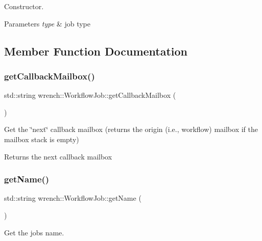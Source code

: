 Constructor. 


\begin{DoxyParams}{Parameters}
{\em type} & job type \\
\hline
\end{DoxyParams}


\subsection{Member Function Documentation}
\mbox{\label{classwrench_1_1_workflow_job_a45c0b59f3792d3d6de90efedbff064bc}} 
\subsubsection{\texorpdfstring{get\+Callback\+Mailbox()}{getCallbackMailbox()}}
{\footnotesize\ttfamily std\+::string wrench\+::\+Workflow\+Job\+::get\+Callback\+Mailbox (\begin{DoxyParamCaption}{ }\end{DoxyParamCaption})}



Get the \char`\"{}next\char`\"{} callback mailbox (returns the origin (i.\+e., workflow) mailbox if the mailbox stack is empty) 

\begin{DoxyReturn}{Returns}
the next callback mailbox 
\end{DoxyReturn}
\mbox{\label{classwrench_1_1_workflow_job_a567b35eaf3952997a71eeedd97138794}} 
\subsubsection{\texorpdfstring{get\+Name()}{getName()}}
{\footnotesize\ttfamily std\+::string wrench\+::\+Workflow\+Job\+::get\+Name (\begin{DoxyParamCaption}{ }\end{DoxyParamCaption})}



Get the job\textquotesingle{}s name. 

